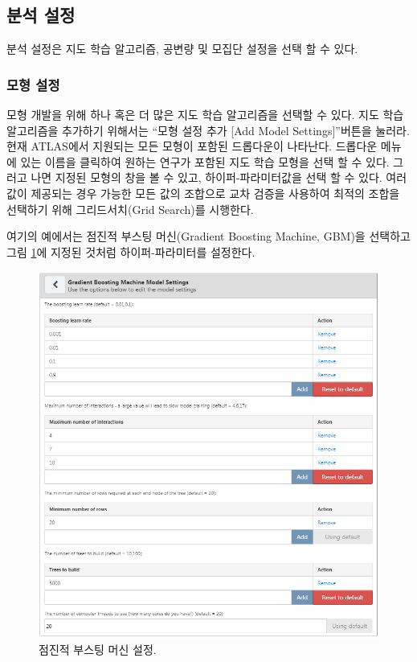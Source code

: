 \documentclass[11pt]{book}
\theoremstyle{definition}
\theoremstyle{definition}
\theoremstyle{definition}
\theoremstyle{remark}
\begin{document}
\subsection{분석 설정}\label{-}

분석 설정은 지도 학습 알고리즘, 공변량 및 모집단 설정을 선택 할 수 있다.

\subsubsection*{모형 설정}\label{-}

모형 개발을 위해 하나 혹은 더 많은 지도 학습 알고리즘을 선택할 수 있다.
지도 학습 알고리즘을 추가하기 위해서는 ``모형 설정 추가 {[}Add Model
Settings{]}''버튼을 눌러라. 현재 ATLAS에서 지원되는 모든 모형이 포함된
드롭다운이 나타난다. 드롭다운 메뉴에 있는 이름을 클릭하여 원하는 연구가
포함된 지도 학습 모형을 선택 할 수 있다. 그러고 나면 지정된 모형의 창을
볼 수 있고, 하이퍼-파라미터값을 선택 할 수 있다. 여러 값이 제공되는 경우
가능한 모든 값의 조합으로 교차 검증을 사용하여 최적의 조합을 선택하기
위해 그리드서치(Grid Search)를 시행한다.

여기의 예에서는 점진적 부스팅 머신(Gradient Boosting Machine, GBM)을
선택하고 그림 \ref{fig:gbmSettings}에 지정된 것처럼 하이퍼-파라미터를
설정한다.

\begin{figure}

{\centering \includegraphics[width=1\linewidth]{images/PatientLevelPrediction/gbmSettings} 

}

\caption{점진적 부스팅 머신 설정.}\label{fig:gbmSettings}
\end{figure}
\end{document}
